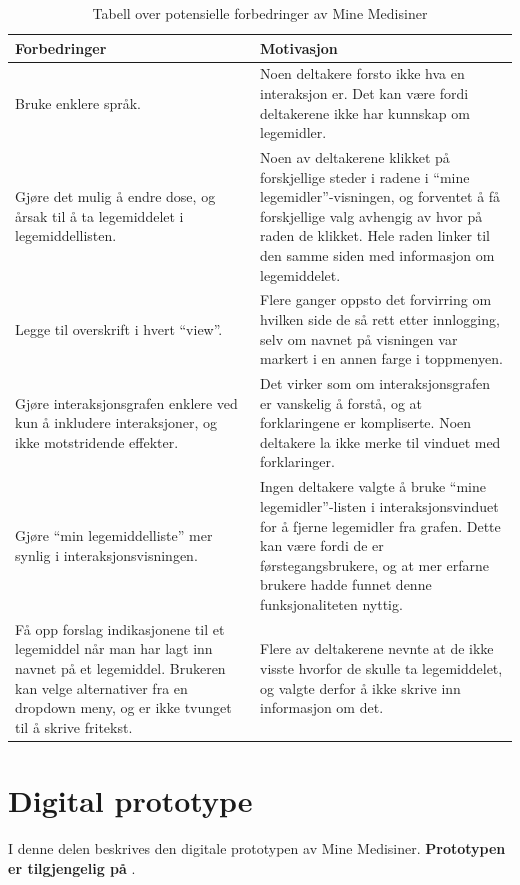 \begin{table}[H]
    \centering
    \begin{tabular}{|p{5cm}|p{6cm}|}
     \hline
     \textbf{Forbedringer} &         \textbf{Motivasjon} \\ \hline
     Bruke enklere språk. & Noen deltakere forsto ikke hva en interaksjon er. Det kan være fordi deltakerene ikke har kunnskap om legemidler. \\  \hline
     Gjøre det mulig å endre dose, og årsak til å ta legemiddelet i legemiddellisten. & Noen av deltakerene klikket på forskjellige steder i radene i “mine legemidler”-visningen, og forventet å få forskjellige valg avhengig av hvor på raden de klikket. Hele raden linker til den samme siden med informasjon om legemiddelet.  \\  \hline
     Legge til overskrift i hvert “view”. & Flere ganger oppsto det forvirring om hvilken side de så rett etter innlogging, selv om navnet på visningen var markert i en annen farge i toppmenyen.  \\  \hline
     Gjøre interaksjonsgrafen enklere ved kun å inkludere interaksjoner, og ikke motstridende effekter. & Det virker som om interaksjonsgrafen er vanskelig å forstå, og at forklaringene er kompliserte. Noen deltakere la ikke merke til vinduet med forklaringer. \\  \hline
     Gjøre “min legemiddelliste” mer synlig i interaksjonsvisningen. & Ingen deltakere valgte å bruke “mine legemidler”-listen i interaksjonsvinduet for å fjerne legemidler fra grafen. Dette kan være fordi de er førstegangsbrukere, og at mer erfarne brukere hadde funnet denne funksjonaliteten nyttig.  \\  \hline
     Få opp forslag indikasjonene til et legemiddel når man har lagt inn navnet på et legemiddel. Brukeren kan velge alternativer fra en dropdown meny, og er ikke tvunget til å skrive fritekst.  & Flere av deltakerene nevnte at de ikke visste hvorfor de skulle ta legemiddelet, og valgte derfor å ikke skrive inn informasjon om det.  \\  \hline
     \end{tabular}
    \caption{Tabell over potensielle forbedringer av Mine Medisiner }
    \label{tab:forbedringer}
\end{table}

\section{Digital prototype} \label{sec:digitalPrototype}
I denne delen beskrives den digitale prototypen av Mine Medisiner. 
\textbf{Prototypen er tilgjengelig på }. 

